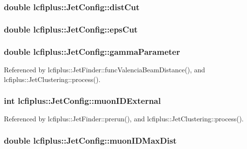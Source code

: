 \subsubsection[{dist\-Cut}]{\setlength{\rightskip}{0pt plus 5cm}double lcfiplus\-::\-Jet\-Config\-::dist\-Cut}\label{structlcfiplus_1_1JetConfig_ad27d267d65150ef585f0e2f2201558cd}
\subsubsection[{eps\-Cut}]{\setlength{\rightskip}{0pt plus 5cm}double lcfiplus\-::\-Jet\-Config\-::eps\-Cut}\label{structlcfiplus_1_1JetConfig_accffa8d0573c78f582d1c880ce880f6e}
\subsubsection[{gamma\-Parameter}]{\setlength{\rightskip}{0pt plus 5cm}double lcfiplus\-::\-Jet\-Config\-::gamma\-Parameter}\label{structlcfiplus_1_1JetConfig_a085ff885cbaac18553611e9485b2beda}


Referenced by lcfiplus\-::\-Jet\-Finder\-::func\-Valencia\-Beam\-Distance(), and lcfiplus\-::\-Jet\-Clustering\-::process().

\subsubsection[{muon\-I\-D\-External}]{\setlength{\rightskip}{0pt plus 5cm}int lcfiplus\-::\-Jet\-Config\-::muon\-I\-D\-External}\label{structlcfiplus_1_1JetConfig_a1e99ac7973ecfe3dac2fa668f29cd1a4}


Referenced by lcfiplus\-::\-Jet\-Finder\-::prerun(), and lcfiplus\-::\-Jet\-Clustering\-::process().

\subsubsection[{muon\-I\-D\-Max\-Dist}]{\setlength{\rightskip}{0pt plus 5cm}double lcfiplus\-::\-Jet\-Config\-::muon\-I\-D\-Max\-Dist}\label{structlcfiplus_1_1JetConfig_ae2f16e160b56f8f6fd83b8c65eed371f}


